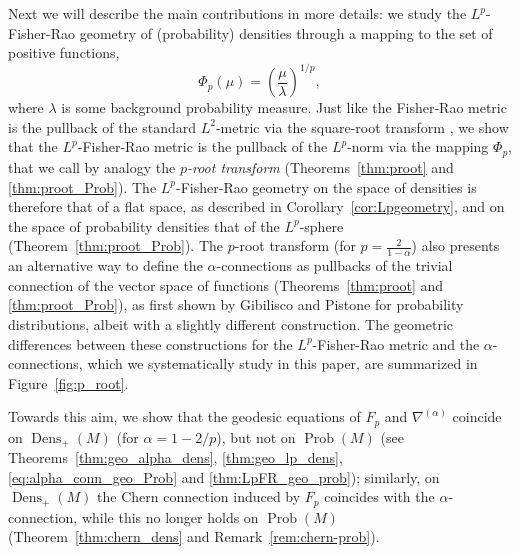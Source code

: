 \documentclass[11pt]{amsart}
\theoremstyle{definition}
\newcommand{\dx}{\lambda}
\newcommand{\Prob}{\operatorname{Prob}(M)}
\newcommand{\Dens}{\operatorname{Dens}_+(M)}
\begin{document}
Next we will describe the main contributions in more details: we study the $L^p$-Fisher-Rao geometry of (probability) densities through a mapping to the set of positive functions,
$$\Phi_p(\mu)=\left(\frac{\mu}{\dx}\right)^{1/p},$$
where $\dx$ is some background probability measure.
Just like the Fisher-Rao metric is the pullback of the standard $L^2$-metric via the square-root transform \cite{khesin2013geometry,bruveris2019geometry,gibilisco2020p},
we show that the $L^p$-Fisher-Rao metric is the pullback of the $L^p$-norm via the mapping $\Phi_p$, that we call by analogy the \emph{$p$-root transform} (Theorems~\ref{thm:proot} and \ref{thm:proot_Prob}). 
The $L^p$-Fisher-Rao geometry on the space of densities is therefore that of a flat space, as described in Corollary~\ref{cor:Lpgeometry}, and on the space of probability densities that of the $L^p$-sphere (Theorem~\ref{thm:proot_Prob}).   
The $p$-root transform (for $p = \frac{2}{1-\alpha}$) also presents an alternative way to define the $\alpha$-connections as pullbacks of the trivial connection of the vector space of functions (Theorems~\ref{thm:proot} and \ref{thm:proot_Prob}), as first shown by Gibilisco and Pistone \cite{gibilisco1998connections} for probability distributions, albeit with a slightly different construction.
The geometric differences between these constructions for the $L^p$-Fisher-Rao metric and the $\alpha$-connections, which we systematically study in this paper, are summarized in Figure~\ref{fig:p_root}.

Towards this aim, we show that the geodesic equations of $F_p$ and $\nabla^{(\alpha)}$ coincide on $\Dens$ (for $\alpha=1-2/p$), but not on $\Prob$ (see Theorems~\ref{thm:geo_alpha_dens}, \ref{thm:geo_lp_dens}, \ref{eq:alpha_conn_geo_Prob} and \ref{thm:LpFR_geo_prob});
similarly, on $\Dens$ the Chern connection induced by $F_p$ coincides with the $\alpha$-connection, while this no longer holds on $\Prob$ (Theorem~\ref{thm:chern_dens} and Remark~\ref{rem:chern-prob}).
\end{document}
